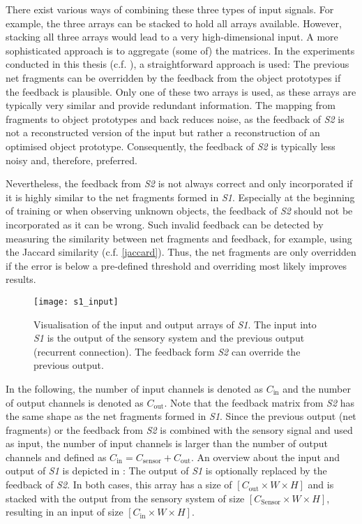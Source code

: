 There exist various ways of combining these three types of input signals. For example, the three arrays can be stacked to hold all arrays available.
However, stacking all three arrays would lead to a very high-dimensional input.
A more sophisticated approach is to aggregate (some of) the matrices.
In the experiments conducted in this thesis (c.f. ), a straightforward approach is used: The previous net fragments can be overridden by the feedback from the object prototypes if the feedback is plausible.
Only one of these two arrays is used, as these arrays are typically very similar and provide redundant information. The mapping from fragments to object prototypes and back reduces noise, as the feedback of \emph{S2} is not a reconstructed version of the input but rather a reconstruction of an optimised object prototype. Consequently, the feedback of \emph{S2} is typically less noisy and, therefore, preferred.

Nevertheless, the feedback from \emph{S2} is not always correct and only incorporated if it is highly similar to the net fragments formed in \emph{S1}. Especially at the beginning of training or when observing unknown objects, the feedback of \emph{S2} should not be incorporated as it can be wrong.
Such invalid feedback can be detected by measuring the similarity between net fragments and feedback, for example, using the Jaccard similarity (c.f. \eqref{jaccard}). Thus, the net fragments are only overridden if the error is below a pre-defined threshold and overriding most likely improves results.

\begin{figure}[h]
    \centering
    \texttt{[image: s1\_input]}
    \caption[Input and output of \emph{S1}]{Visualisation of the input and output arrays of \emph{S1}. The input into \emph{S1} is the output of the sensory system and the previous output (recurrent connection). The feedback form \emph{S2} can override the previous output.}
\end{figure}


In the following, the number of input channels is denoted as $C_{\text{in}}$ and the number of output channels is denoted as $C_{\text{out}}$.
Note that the feedback matrix from \emph{S2} has the same shape as the net fragments formed in \emph{S1}.
Since the previous output (net fragments) or the feedback from \emph{S2} is combined with the sensory signal and used as input, the number of input channels is larger than the number of output channels and defined as $C_{\text{in}} = C_{\text{sensor}} + C_{\text{out}}$.
An overview about the input and output of \emph{S1} is depicted in :
The output of \emph{S1} is optionally replaced by the feedback of \emph{S2}. In both cases, this array has a size of $[C_{\text{out}} \times W \times H]$ and is stacked with the output from the sensory system of size $[C_{\text{Sensor}} \times W \times H]$, resulting in an input of size $[C_{\text{in}} \times W \times H]$.


